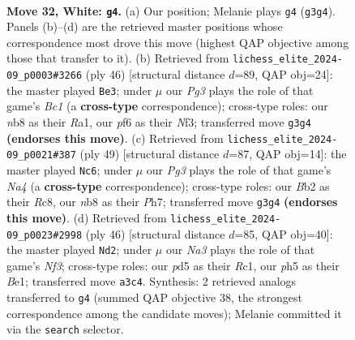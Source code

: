 \documentclass[11pt]{article}
\begin{document}
\clearpage

\begin{figure}[p]\centering
\begin{subfigure}{0.46\textwidth}\centering
\resizebox{\linewidth}{!}{%
\newchessgame
\chessboard[
  setfen={1nb5/rp1n2k1/5p2/p2p2pp/1b6/NP2P1PP/PBB1PK2/1R6 w - - 0 32},
  showmover=false,
  pgfstyle=straightmove, color=movearrow, markmove={g3-g4}
]}
\caption{}
\end{subfigure}\hfill
\begin{subfigure}{0.46\textwidth}\centering
\resizebox{\linewidth}{!}{%
\newchessgame
\chessboard[
  setfen={4rbk1/p2n1p2/2B4p/2pP2p1/2p5/2P2NPb/PP3P2/R1B3K1 w - - 0 24},
  showmover=false,
  pgfstyle=straightmove, color=movearrow, markmove={c1-e3}
]}
\caption{}
\end{subfigure}
\\[4pt]
\begin{subfigure}{0.46\textwidth}\centering
\resizebox{\linewidth}{!}{%
\newchessgame
\chessboard[
  setfen={2r5/p4kpp/p3bp2/n2p3P/3P2P1/1PN2P2/P2B1K2/2R5 b - - 2 25},
  showmover=false,
  pgfstyle=straightmove, color=movearrow, markmove={a5-c6}
]}
\caption{}
\end{subfigure}\hfill
\begin{subfigure}{0.46\textwidth}\centering
\resizebox{\linewidth}{!}{%
\newchessgame
\chessboard[
  setfen={3r2k1/pp2pp2/2n2bp1/7p/P1B1b3/1PP2N1P/5PP1/2R1B1K1 w - - 0 24},
  showmover=false,
  pgfstyle=straightmove, color=movearrow, markmove={f3-d2}
]}
\caption{}
\end{subfigure}
\caption{\textbf{Move 32, White: \texttt{g4}.} (a) Our position; Melanie plays \texttt{g4} (\texttt{g3g4}). Panels (b)--(d) are the retrieved master positions whose correspondence most drove this move (highest QAP objective among those that transfer to it). (b) Retrieved from \texttt{lichess\_elite\_2024-09\_p0003\#3266} (ply 46) [structural distance $d$=89, QAP obj=24]: the master played \texttt{Be3}; under $\mu$ our \emph{Pg3} plays the role of that game's \emph{Bc1} (a \textbf{cross-type} correspondence); cross-type roles: our \emph{n}b8 as their \emph{R}a1, our \emph{p}f6 as their \emph{N}f3; transferred move \texttt{g3g4} \textbf{(endorses this move)}. (c) Retrieved from \texttt{lichess\_elite\_2024-09\_p0021\#387} (ply 49) [structural distance $d$=87, QAP obj=14]: the master played \texttt{Nc6}; under $\mu$ our \emph{Pg3} plays the role of that game's \emph{Na4} (a \textbf{cross-type} correspondence); cross-type roles: our \emph{B}b2 as their \emph{R}c8, our \emph{n}b8 as their \emph{P}h7; transferred move \texttt{g3g4} \textbf{(endorses this move)}. (d) Retrieved from \texttt{lichess\_elite\_2024-09\_p0023\#2998} (ply 46) [structural distance $d$=85, QAP obj=40]: the master played \texttt{Nd2}; under $\mu$ our \emph{Na3} plays the role of that game's \emph{Nf3}; cross-type roles: our \emph{p}d5 as their \emph{R}c1, our \emph{p}h5 as their \emph{B}e1; transferred move \texttt{a3c4}. Synthesis: 2 retrieved analogs transferred to \texttt{g4} (summed QAP objective 38, the strongest correspondence among the candidate moves); Melanie committed it via the \texttt{search} selector.}
\label{fig:thought-m62}
\end{figure}
\end{document}
